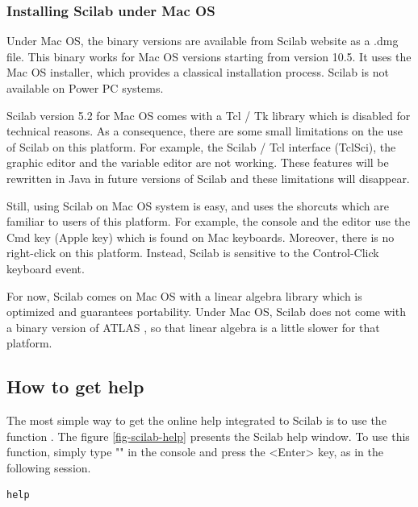 \subsubsection{Installing Scilab under Mac OS}
Under Mac OS, the binary versions are available from Scilab 
website as a .dmg file. This binary works for Mac OS versions 
starting from version 10.5. It uses the Mac OS installer, which 
provides a classical installation process. 
Scilab is not available on Power PC systems. 

Scilab version 5.2 for Mac OS comes with a Tcl / Tk library which is disabled 
for technical reasons.
As a consequence, there are some small limitations on the 
use of Scilab on this platform. For example, the Scilab / Tcl interface (TclSci), the 
graphic editor and the variable editor are not working.
These features will be rewritten in Java in future versions of 
Scilab and these limitations will disappear.

Still, using Scilab on Mac OS system is easy, and uses the 
shorcuts which are familiar to users of this platform. For example, 
the console and the editor use the Cmd key (Apple key) which is 
found on Mac keyboards. Moreover, there is no right-click 
on this platform. Instead, Scilab is sensitive to the 
Control-Click keyboard event. 

For now, Scilab comes on Mac OS with a linear algebra library which is optimized 
and guarantees portability.
Under Mac OS, Scilab does not come with a binary version of ATLAS \cite{AtlasWWW},
so that linear algebra is a little slower for that platform.

\subsection{How to get help}
The most simple way to get the online help integrated to 
Scilab is to use the function . 
The figure \ref{fig-scilab-help} presents the Scilab help window.
To use this function, simply type "" in the console 
and press the <Enter> key, as in the following session.

\lstset{language=scilabscript}
\begin{lstlisting}
help
\end{lstlisting}

